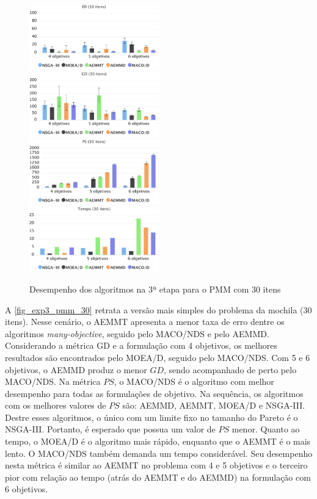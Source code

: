 \begin{figure}[!htbp]	
	\includegraphics[width=0.5\textwidth]{cap_experimentos/figs/etapa3/er-mkp-30}
	\includegraphics[width=0.5\textwidth]{cap_experimentos/figs/etapa3/gd-mkp-30}
	\includegraphics[width=0.5\textwidth]{cap_experimentos/figs/etapa3/ps-mkp-30}
	\includegraphics[width=0.5\textwidth]{cap_experimentos/figs/etapa3/time-mkp-30}
	\caption{\label{fig_exp3_pmm_30}Desempenho dos algoritmos na 3ª etapa para o PMM com 30 itens}
\end{figure}

A \autoref{fig_exp3_pmm_30} retrata a versão mais simples do problema da mochila (30 itens). Nesse cenário, o AEMMT apresenta a menor taxa de erro dentre os algoritmos \textit{many-objective}, seguido pelo MACO/NDS e pelo AEMMD. Considerando a métrica GD e a formulação com 4 objetivos, os melhores resultados são encontrados pelo MOEA/D, seguido pelo MACO/NDS. Com 5 e 6 objetivos, o AEMMD produz o menor $GD$, sendo acompanhado de perto pelo MACO/NDS. Na métrica $PS$, o MACO/NDS é o algoritmo com melhor desempenho para todas as formulações de objetivo. Na sequência, os algoritmos com os melhores valores de $PS$ são: AEMMD, AEMMT, MOEA/D e NSGA-III. Destre esses algoritmos, o único com um limite fixo no tamanho do Pareto é o NSGA-III. Portanto, é esperado que possua um valor de $PS$ menor. Quanto ao tempo, o MOEA/D é o algoritmo mais rápido, enquanto que o AEMMT é o mais lento. O MACO/NDS também demanda um tempo considerável. Seu desempenho nesta métrica é similar ao AEMMT no problema com 4 e 5 objetivos e o terceiro pior com relação ao tempo (atrás do AEMMT e do AEMMD) na formulação com 6 objetivos.

